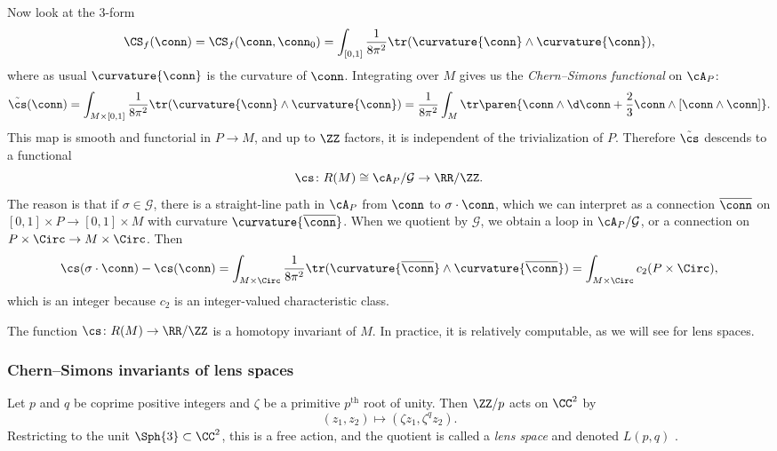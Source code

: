 Now look at the $3$-form
\begin{equation*}
  \CS_{f }(\conn)=\CS_{f }(\conn, \conn_0)=\int_{[0,1]}\frac{1}{8\pi^2}\tr(\curvature{\conn}\wedge \curvature{\conn}),
\end{equation*}
where as usual $\curvature{\conn}$ is the curvature of $\conn$.
Integrating over $M$ gives us the \textit{Chern--Simons functional} on $\cA_P$:
\begin{equation}
\label{CS_fun}
  \tilde{\cs}(\conn)=\int_{M\times[0,1]}\frac{1}{8\pi^2}\tr(\curvature{\conn}\wedge \curvature{\conn}) = \frac{1}{8\pi^2}\int_M 
  \tr\paren{\conn\wedge \d\conn +\frac{2}{3}\conn\wedge [\conn\wedge \conn]}.
\end{equation}
This map is smooth and functorial in $P\rightarrow M$, and up to $\ZZ$ factors, it is independent of the
trivialization of $P$. Therefore $\tilde{\cs}$ descends to a functional
\begin{equation}
	\cs \colon R(M)\cong\cA_P/\mathcal{G}\rightarrow\RR/\ZZ.
\end{equation}
The reason is that if $\sigma\in\mathcal{G}$, there is a straight-line path in $\cA_P$ from $\conn$ to
$\sigma\cdot\conn$, which we can interpret as a connection $\overline\conn$ on $[0,1]\times P\to[0,1]\times M$
with curvature $\curvature{\overline\conn}$. When we quotient by $\mathcal G$, we obtain a loop in $\cA_P/\mathcal{G}$, or
a connection on $P\times \Circ\to M\times \Circ$. Then
\begin{equation*}
  \cs(\sigma\cdot \conn)-\cs(\conn)=\int_{M\times \Circ}\frac{1}{8\pi^2}\tr(\curvature{\overline\conn}\wedge \curvature{\overline\conn}) =
  \int_{M\times\Circ} c_2(P\times\Circ),
\end{equation*}
which is an integer because $c_2$ is an integer-valued characteristic class.

The function $\cs\colon R(M)\to\RR/\ZZ$ is a homotopy invariant of $M$. In practice, it is relatively computable,
as we will see for lens spaces.


\subsubsection{Chern--Simons invariants of lens spaces}
Let $p$ and $q$ be coprime positive integers and $\zeta$ be a primitive $p^{\mathrm{th}}$ root of unity. Then
$\ZZ/p$ acts on $\CC^2$ by
\begin{equation}
	(z_1, z_2)\mapsto (\zeta z_1, \zeta^q z_2).
\end{equation}
Restricting to the unit $\Sph{3}\subset\CC^2$, this is a free action, and the quotient is called a \textit{lens space}
and denoted $L(p, q)$ \cite[\S 20]{Tie08}.

